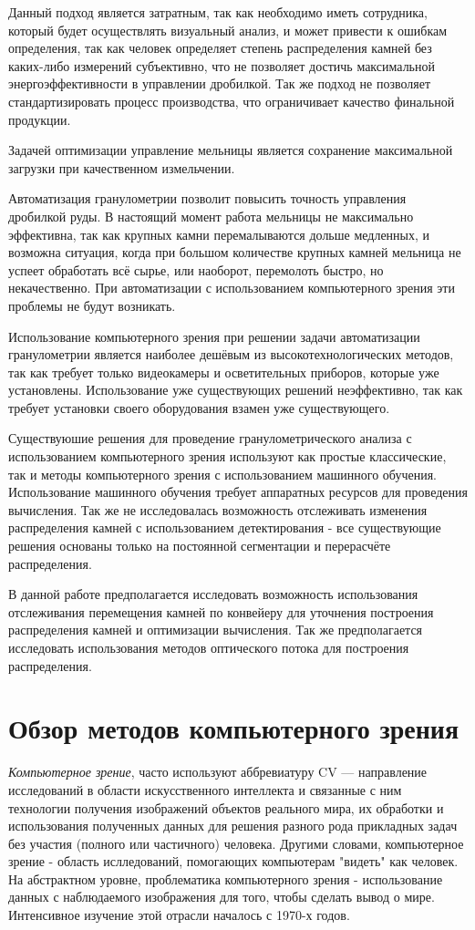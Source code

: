 \documentclass[specification,annotation,times]{itmo-student-thesis}
\begin{document}
Данный подход является затратным, так как необходимо иметь сотрудника, который будет осуществлять визуальный анализ, и может привести к ошибкам определения, так как человек определяет степень распределения камней без каких-либо измерений субъективно, что не позволяет достичь максимальной энергоэффективности в управлении дробилкой. Так же подход не позволяет стандартизировать процесс производства, что ограничивает качество финальной продукции.

Задачей оптимизации управление мельницы является сохранение максимальной загрузки при качественном измельчении. 

Автоматизация гранулометрии позволит повысить точность управления дробилкой руды. В настоящий момент работа мельницы не максимально эффективна, так как крупных камни перемалываются дольше медленных, и возможна ситуация, когда при большом количестве крупных камней мельница не успеет обработать всё сырье, или наоборот, перемолоть быстро, но некачественно. При автоматизации с использованием компьютерного зрения эти проблемы не будут возникать. 

Использование компьютерного зрения при решении задачи автоматизации гранулометрии является наиболее дешёвым из высокотехнологических методов, так как требует только видеокамеры и осветительных приборов, которые уже установлены. Использование уже существующих решений неэффективно, так как требует установки своего оборудования взамен уже существующего.


Существуюшие решения для проведение гранулометрического анализа с использованием компьютерного зрения используют  как простые классические, так и методы компьютерного зрения с использованием машинного обучения. Использование машинного обучения требует  аппаратных ресурсов для проведения вычисления. Так же не исследовалась возможность отслеживать изменения распределения камней с использованием детектирования - все существующие решения основаны только на постоянной сегментации и перерасчёте распределения.

В данной работе предполагается исследовать возможность использования отслеживания перемещения камней по конвейеру для уточнения построения распределения камней и оптимизации вычисления. Так же предполагается исследовать использования методов оптического потока для построения распределения.


\section{Обзор методов компьютерного зрения}
\textit{Компьютерное зрение}, часто используют аббревиатуру CV — направление исследований в области искусственного интеллекта и связанные с ним технологии получения изображений объектов реального мира, их обработки и использования полученных данных для решения разного рода прикладных задач без участия (полного или частичного) человека. Другими словами, компьютерное зрение - область ислледований, помогающих компьютерам "видеть" как человек. На абстрактном уровне, проблематика компьютерного зрения - использование данных с наблюдаемого изображения для того, чтобы сделать вывод о мире. Интенсивное изучение этой отрасли началось с 1970-х годов.
\end{document}
